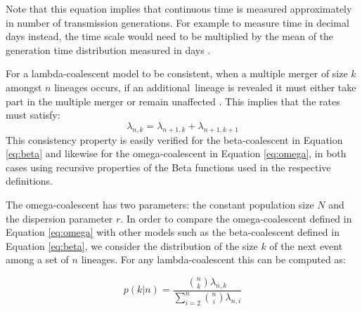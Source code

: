 \documentclass{article}
\renewcommand{\eqref}[1]{\ref{#1}}
\begin{document}
Note that this equation implies that continuous time is measured
approximately in number of transmission generations. 
For example to measure time in decimal days instead, the time scale
would need to be multiplied by the mean of the generation time 
distribution measured in days \citep{Svensson2007}.

For a lambda-coalescent model to be consistent, 
when a multiple merger of size $k$ amongst $n$ lineages occurs, if 
an additional lineage is revealed it must either take part in the multiple merger or 
remain unaffected \citep{berestyckiRecentProgressCoalescent2009}.
This implies that the rates must satisfy: 
\begin{equation}
\lambda_{n,k}=\lambda_{n+1,k}+\lambda_{n+1,k+1}
\label{eq:consistency}
\end{equation}
This consistency property is easily verified for the beta-coalescent in Equation \eqref{eq:beta}
and likewise for the omega-coalescent in Equation \eqref{eq:omega}, in both
cases using recursive properties of the Beta functions used in the respective definitions.

The omega-coalescent has two parameters: the constant population size $N$ and
the dispersion parameter $r$. 
In order to compare the omega-coalescent defined in Equation \eqref{eq:omega}
with other models such as the beta-coalescent defined in Equation \eqref{eq:beta}, we consider 
the distribution of the size $k$ of the next event among
a set of $n$ lineages. For any lambda-coalescent this can be computed as:

\begin{equation}
p(k|n)=\frac{\binom{n}{k}\lambda_{n,k}}{\sum_{i=2}^n \binom{n}{i}\lambda_{n,i}}
\label{eq:nextsize}
\end{equation}
\end{document}
